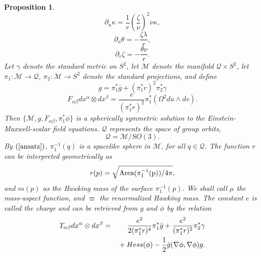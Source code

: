 \documentclass{article}
\newtheorem{proposition}[theorem]{Proposition}
\newcommand{\zn}{\frac{\zeta}{\nu}}
\begin{document}
\begin{proposition}
\begin{equation}
\label{fdb1}
\partial_u\kappa=
\frac1{r}\left(\zn\right)^2\nu\kappa,
\end{equation}
\begin{equation}
\label{sign1}
\partial_u\theta=-\frac{\zeta\lambda}r,
\end{equation}
\begin{equation}
\label{sign2}
\partial_v\zeta=-\frac{\theta\nu}r.
\end{equation}
Let $\gamma$ denote the standard metric on $S^2$, 
let $\mathcal{M}$ denote the manifold $\mathcal{Q}\times S^2$,
let $\pi_1:\mathcal{M}\to\mathcal{Q}$, $\pi_2:\mathcal{M}\to S^2$
denote the standard projections, and define
\begin{equation}
\label{ansatz}
g=\pi_1^*\bar{g}+(\pi_1^*r)^2\pi_2^*\gamma
\end{equation}
\begin{equation}
\label{Fcharge}
F_{\alpha\beta}dx^\alpha\otimes dx^\beta=
\frac{e}{(\pi_1^*r)^2}\pi_1^*(\Omega^2 du\wedge dv).
\end{equation}
Then $\{\mathcal{M},g,F_{\alpha\beta}, \pi_1^*\phi\}$ is a spherically
symmetric solution to the Einstein-Maxwell-scalar field equations.
$\mathcal{Q}$ represents the space of group orbits, 
\begin{equation}
\label{Qdef}
\mathcal{Q}=\mathcal{M}/SO(3).
\end{equation}
By $(\ref{ansatz})$, $\pi_1^{-1}(q)$ is a spacelike sphere in $\mathcal{M}$,
for all $q\in\mathcal{Q}$.
The function $r$ can be interpreted geometrically
as 
\begin{equation}
\label{geoint}
r(p)=\sqrt{{\rm Area(\pi_1^{-1}(p))}/4\pi},
\end{equation}
and $m(p)$ as the \emph{Hawking mass} of the surface $\pi_1^{-1}(p)$. 
We shall call $\mu$ the \emph{mass-aspect function}, and
$\varpi$ the \emph{renormalized Hawking mass}.
The constant $e$ is called the \emph{charge} and can be retrieved
from $g$ and $\phi$ by the relation
\begin{eqnarray}
\label{giatoe}
\nonumber
T_{\alpha\beta}dx^\alpha\otimes dx^\beta&=&
\frac{e^2}{2(\pi_1^*r)^4}\pi_1^*\bar{g}+\frac{e^2}{(\pi_1^*r)^2}\pi_2^*\gamma\\
&&\hbox{}+Hess(\phi)
-\frac12\bar{g}(\nabla\phi,\nabla\phi)g.
\end{eqnarray}


\end{proposition}
\end{document}

